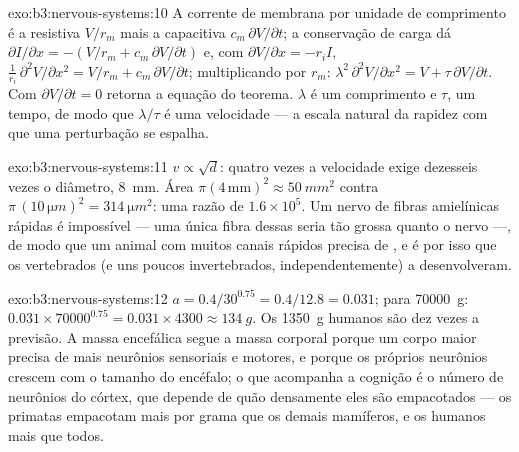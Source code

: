 \begin{solution}{exo:b3:nervous-systems:10}
A corrente de membrana por unidade de comprimento é a resistiva
$V/r_{m}$ mais a capacitiva $c_{m}\,\partial V/\partial t$; a
conservação de carga dá $\partial I/\partial x = -(V/r_{m} + c_{m}\,\partial V/\partial t)$ e, com $\partial V/\partial x = -r_{i}I$,
$\frac{1}{r_{i}}\,\partial^{2}V/
\partial x^{2} = V/r_{m} + c_{m}\,\partial V/\partial t$; multiplicando por $r_{m}$:
$\lambda^{2}\,\partial^{2}V/\partial x^{2} = V + \tau\,\partial
V/\partial t$. Com $\partial V/\partial t = 0$ retorna a equação do
teorema. $\lambda$ é um comprimento e $\tau$, um tempo, de modo que
$\lambda/\tau$ é uma velocidade --- a escala natural da rapidez com que
uma perturbação se espalha.
\end{solution}

\begin{solution}{exo:b3:nervous-systems:11}
$v \propto \sqrt{d}$: quatro vezes a velocidade exige dezesseis vezes o
diâmetro, \qty{8}{mm}. Área $\pi(4\,\text{mm})^{2} \approx \qty{50}{mm^2}$ contra $\pi\,(10\,\unit{\micro m})^{2} = \qty{314}{\micro m^2}$: uma razão de $1.6\times 10^{5}$. Um nervo de
fibras amielínicas rápidas é impossível --- uma única fibra dessas seria
tão grossa quanto o nervo ---, de modo que um animal com muitos canais
rápidos precisa de , e é por isso que os vertebrados (e uns
poucos invertebrados, independentemente) a desenvolveram.
\end{solution}

\begin{solution}{exo:b3:nervous-systems:12}
$a = 0.4/30^{0.75} = 0.4/12.8 = 0.031$; para \qty{70000}{g}: $0.031\times
\num{70000}^{0.75} = 0.031\times 4300 \approx \qty{134}{g}$. Os
\qty{1350}{g} humanos são dez vezes a previsão. A massa encefálica segue
a massa corporal porque um corpo maior precisa de mais neurônios
sensoriais e motores, e porque os próprios neurônios crescem com o
tamanho do encéfalo; o que acompanha a cognição é o número de neurônios
do córtex, que depende de quão densamente eles são empacotados --- os
primatas empacotam mais por grama que os demais mamíferos, e os humanos
mais que todos.
\end{solution}

